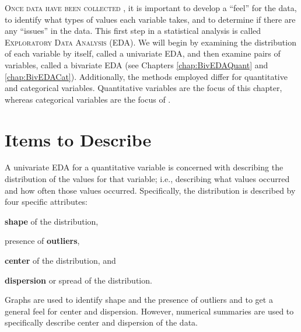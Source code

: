 \documentclass[10pt,openany]{book}\usepackage[]{graphicx}\usepackage[]{color}
\begin{document}
\minitoc
\newpage

\lettrine{O}{nce data have been collected} , it is important to develop a ``feel'' for the data, to identify what types of values each variable takes, and to determine if there are any ``issues'' in the data.  This first step in a statistical analysis is called \textsc{Exploratory Data Analysis} (EDA).  We will begin by examining the distribution of each variable by itself, called a univariate EDA, and then examine pairs of variables, called a bivariate EDA (see Chapters \ref{chap:BivEDAQuant} and \ref{chap:BivEDACat}). Additionally, the methods employed differ for quantitative and categorical variables. Quantitative variables are the focus of this chapter, whereas categorical variables are the focus of .

\vspace{-6pt}
\section{Items to Describe}
\vspace{-12pt}
A univariate EDA for a quantitative variable is concerned with describing the distribution of the values for that variable; i.e., describing what values occurred and how often those values occurred.  Specifically, the distribution is described by four specific attributes:

\vspace{-12pt}
\begin{Enumerate}
  \item \textbf{shape} of the distribution,
  \item presence of \textbf{outliers},
  \item \textbf{center} of the distribution, and
  \item \textbf{dispersion} or spread of the distribution.
\end{Enumerate}
\vspace{-8pt}

Graphs are used to identify shape and the presence of outliers and to get a general feel for center and dispersion.  However, numerical summaries are used to specifically describe center and dispersion of the data.

\vspace{-6pt}

\vspace{-12pt}
\end{document}
